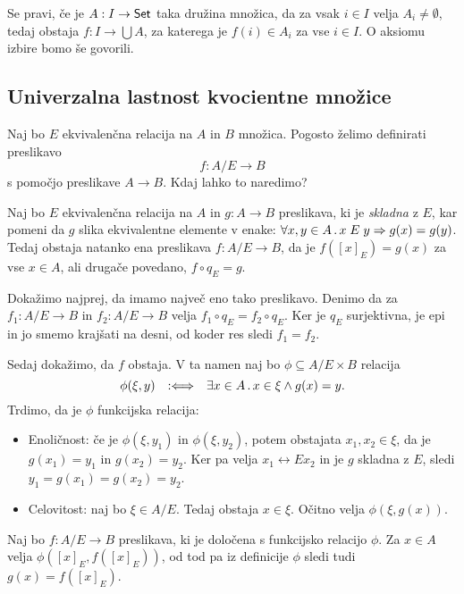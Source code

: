 Se pravi, če je $A : I \to \mathsf{Set}$ taka družina množica, da za vsak $i \in I$ velja $A_i \neq \emptyset$,
tedaj obstaja $f : I \to \bigcup A$, za katerega je $f(i) \in A_i$ za vse $i \in I$.
%
O aksiomu izbire bomo še govorili.


\subsection{Univerzalna lastnost kvocientne množice}

Naj bo $E$ ekvivalenčna relacija na $A$ in $B$ množica. Pogosto želimo definirati
preslikavo
%
\begin{equation*}
    f : A/E \to B
\end{equation*}
%
s pomočjo preslikave $A \to B$. Kdaj lahko to naredimo?

\begin{izrek}
  Naj bo $E$ ekvivalenčna relacija na $A$ in $g : A \to B$ preslikava, ki je \emph{skladna} z $E$, kar pomeni da $g$
  slika ekvivalentne elemente v enake: $\forall x, y \in A \,.\, x \mathrel{E} y \Rightarrow g(x) = g(y)$. Tedaj obstaja natanko ena
  preslikava $f : A/E \to B$, da je $f([x]_E) = g(x)$ za vse $x \in A$, ali drugače povedano, $f \circ q_E = g$.
\end{izrek}

\begin{dokaz}
  Dokažimo najprej, da imamo največ eno tako preslikavo. Denimo da za $f_1 : A/E \to B$ in
  $f_2 : A/E \to B$ velja $f_1 \circ q_E = f_2 \circ q_E$. Ker je $q_E$ surjektivna, je epi in jo smemo
  krajšati na desni, od koder res sledi $f_1 = f_2$.

  Sedaj dokažimo, da $f$ obstaja. V ta namen naj bo $\phi \subseteq A/E \times B$ relacija
  \begin{equation*}
    \phi(\xi, y) \quad {{:}{\Longleftrightarrow}}\quad \exists x \in A \,.\, x \in \xi \land g(x) = y.
  \end{equation*}
  Trdimo, da je $\phi$ funkcijska relacija:
  \begin{itemize}
  \item
    Enoličnost: če je $\phi(\xi, y_1)$ in $\phi(\xi, y_2)$, potem obstajata $x_1, x_2 \in \xi$, da je $g(x_1) = y_1$
    in $g(x_2) = y_2$. Ker pa velja $x_1 \rel{E} x_2$ in je $g$ skladna z $E$, sledi $y_1 = g(x_1) = g(x_2) = y_2$.

  \item  Celovitost: naj bo $\xi \in A/E$. Tedaj obstaja $x \in \xi$. Očitno velja $\phi(\xi, g(x))$.
  \end{itemize}
  Naj bo $f : A/E \to B$ preslikava, ki je določena s funkcijsko relacijo $\phi$. Za $x \in A$
  velja $\phi([x]_E, f([x]_E))$, od tod pa iz definicije $\phi$ sledi tudi $g(x) = f([x]_E)$.
\end{dokaz}

